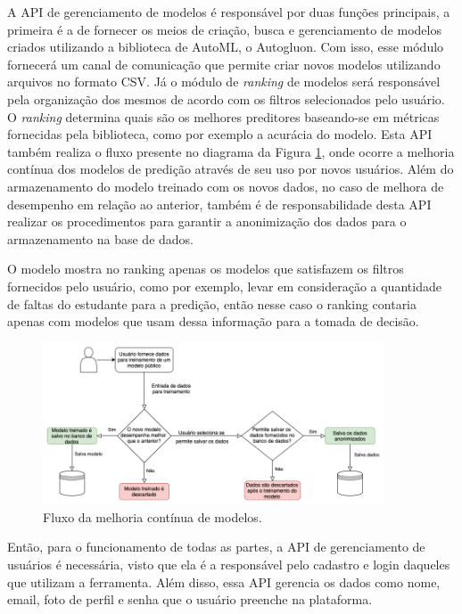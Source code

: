 \documentclass[12pt]{article}
\begin{document}
A API de gerenciamento de modelos é responsável por duas funções principais, a primeira é a de fornecer os meios de criação, busca e gerenciamento de modelos criados utilizando a biblioteca de AutoML, o Autogluon. Com isso, esse módulo fornecerá um canal de comunicação que permite criar novos modelos utilizando arquivos no formato CSV. Já o módulo de \textit{ranking} de modelos será responsável pela organização dos mesmos de acordo com os filtros selecionados pelo usuário. O \textit{ranking} determina quais são os melhores preditores baseando-se em métricas fornecidas pela biblioteca, como por exemplo a acurácia do modelo. Esta API também realiza o fluxo presente no diagrama da Figura \ref{fig:fluxograma}, onde ocorre a melhoria contínua dos modelos de predição através de seu uso por novos usuários. Além do armazenamento do modelo treinado com os novos dados, no caso de melhora de desempenho em relação ao anterior, também é de responsabilidade desta API realizar os procedimentos para garantir a anonimização dos dados para o armazenamento na base de dados.

O modelo mostra no ranking apenas os modelos que satisfazem os filtros fornecidos pelo usuário, como por exemplo, levar em consideração a quantidade de faltas do estudante para a predição, então nesse caso o ranking contaria apenas com modelos que usam dessa informação para a tomada de decisão.

\begin{figure}[ht]
\centering
\includegraphics[width=0.9\textwidth]{images/fluxograma.png}
\caption{Fluxo da melhoria contínua de modelos.}
\label{fig:fluxograma}
\end{figure}


Então, para o funcionamento de todas as partes, a API de gerenciamento de usuários é necessária, visto que ela é a responsável pelo cadastro e login daqueles que utilizam a ferramenta. Além disso, essa API gerencia os dados como nome, email, foto de perfil e senha que o usuário preenche na plataforma.
\end{document}
